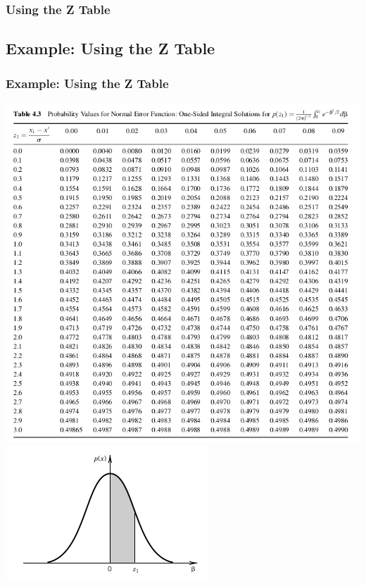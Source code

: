 \documentclass[fleqn]{beamer} %
\newcommand{\sectionIIsubsectionIIItitle}{Using the Z Table}
\newcommand{\sectionIIsubsectionIVtitle}{Example: Using the Z Table}
\begin{document}
			\begin{frame}
			\frametitle{\sectionIIsubsectionIIItitle}





			\end{frame}

		\subsection{\sectionIIsubsectionIVtitle}\label{sectionIIsubsectionIV}

			\begin{frame}
				\frametitle{\sectionIIsubsectionIVtitle}

		\includegraphics[scale=.25]{images/topic2_fig2.png}	
		\includegraphics[scale=.45]{images/topic2_fig3.png}


			\end{frame}
\end{document}
